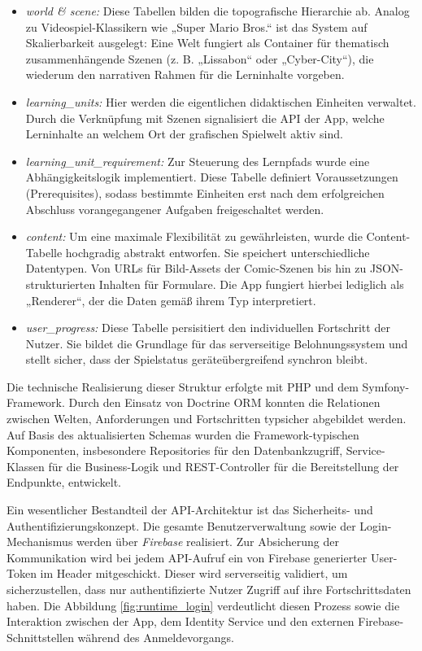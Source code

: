 \begin{itemize}
    \item \textit{world \& scene:} Diese Tabellen bilden die topografische Hierarchie ab. Analog zu Videospiel-Klassikern wie „Super Mario Bros.“ ist das System auf Skalierbarkeit 
    ausgelegt: Eine Welt fungiert als Container für thematisch zusammenhängende Szenen (z. B. „Lissabon“ oder „Cyber-City“), die wiederum den narrativen Rahmen für die Lerninhalte 
    vorgeben.
    \item \textit{learning\_units:} Hier werden die eigentlichen didaktischen Einheiten verwaltet. Durch die Verknüpfung mit Szenen signalisiert die API der App, welche Lerninhalte 
    an welchem Ort der grafischen Spielwelt aktiv sind.
    \item \textit{learning\_unit\_requirement:} Zur Steuerung des Lernpfads wurde eine Abhängigkeitslogik implementiert. Diese Tabelle definiert Voraussetzungen (Prerequisites), sodass 
    bestimmte Einheiten erst nach dem erfolgreichen Abschluss vorangegangener Aufgaben freigeschaltet werden.
    \item \textit{content:} Um eine maximale Flexibilität zu gewährleisten, wurde die Content-Tabelle hochgradig abstrakt entworfen. Sie speichert unterschiedliche Datentypen. Von URLs 
    für Bild-Assets der Comic-Szenen bis hin zu JSON-strukturierten Inhalten für Formulare. Die App fungiert hierbei lediglich als „Renderer“, der die Daten gemäß 
    ihrem Typ interpretiert.
    \item \textit{user\_progress:} Diese Tabelle persisitiert den individuellen Fortschritt der Nutzer. Sie bildet die Grundlage für das serverseitige Belohnungssystem und stellt sicher,
     dass der Spielstatus geräteübergreifend synchron bleibt.
\end{itemize}

Die technische Realisierung dieser Struktur erfolgte mit PHP und dem Symfony-Framework. Durch den Einsatz von Doctrine ORM konnten die Relationen zwischen Welten, Anforderungen und 
Fortschritten typsicher abgebildet werden. Auf Basis des aktualisierten Schemas wurden die Framework-typischen Komponenten, insbesondere Repositories für den Datenbankzugriff, 
Service-Klassen für die Business-Logik und REST-Controller für die Bereitstellung der Endpunkte, entwickelt.

Ein wesentlicher Bestandteil der API-Architektur ist das Sicherheits- und Authentifizierungskonzept. Die gesamte Benutzerverwaltung sowie der Login-Mechanismus werden über 
\textit{Firebase} \cite{Firebase} realisiert. Zur Absicherung der Kommunikation wird bei jedem API-Aufruf ein von Firebase generierter User-Token im Header mitgeschickt. Dieser wird serverseitig 
validiert, um sicherzustellen, dass nur authentifizierte Nutzer Zugriff auf ihre Fortschrittsdaten haben. Die Abbildung \ref{fig:runtime_login} verdeutlicht diesen Prozess sowie 
die Interaktion zwischen der App, dem Identity Service und den externen Firebase-Schnittstellen während des Anmeldevorgangs.

